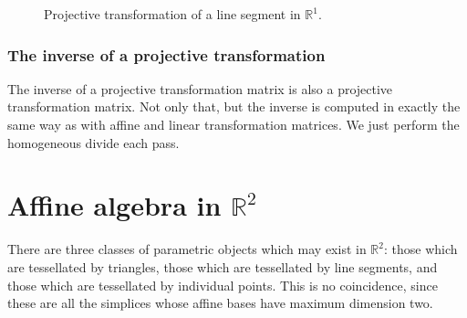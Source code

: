 \begin{figure}
    \caption{Projective transformation of a line segment in \(\mathbb{R}^{1}\).}
    \label{fig:affine-R1projectivetransformation}
\end{figure}

\subsubsection{The inverse of a projective transformation}

The inverse of a projective transformation matrix is also a projective
transformation matrix. Not only that, but the inverse is computed in 
exactly the same way as with affine and linear transformation matrices.
We just perform the homogeneous divide each pass.


\section{Affine algebra in \texorpdfstring{\(\mathbb{R}^{2}\)}{R2}}

There are three classes of parametric objects which may exist in 
\(\mathbb{R}^{2}\): those which are tessellated by triangles, those 
which are tessellated by line segments, and those which are tessellated 
by individual points. This is no coincidence, since these are all the 
simplices whose affine bases have maximum dimension two.

